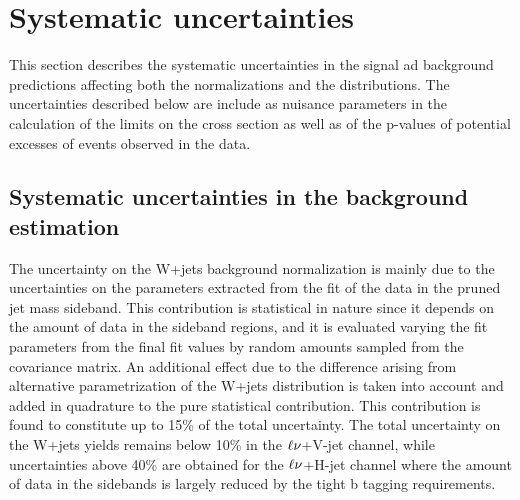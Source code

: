 \section{Systematic uncertainties}\label{sec:systUnc}

This section describes the systematic uncertainties in the signal ad background predictions affecting both the normalizations and the \mlvj distributions.
The uncertainties described below are include as nuisance parameters in the calculation of the limits on the cross section as well as of the p-values of potential excesses of events
observed in the data. %

\subsection{Systematic uncertainties in the background estimation}\label{subsec:uncBkg}

The uncertainty on the W+jets background normalization is mainly due to the uncertainties on the parameters extracted from the fit of the data in the pruned jet mass sideband. This contribution is statistical in nature since it depends on the amount of data in the \mJ sideband regions, and it is evaluated varying the fit parameters from the final fit values by random amounts sampled from the covariance matrix.
An additional effect due to the difference arising from alternative parametrization of the W+jets \mJ distribution is taken into account and added in quadrature to the pure statistical contribution. This contribution is found to constitute up to 15\% of the total uncertainty. The total uncertainty on the W+jets yields remains below 10\% in the $\ell\nu$+V-jet channel, while uncertainties above 40\% are obtained for the $\ell\nu$+H-jet channel where the amount of data in the sidebands is largely reduced by the tight b tagging requirements.

